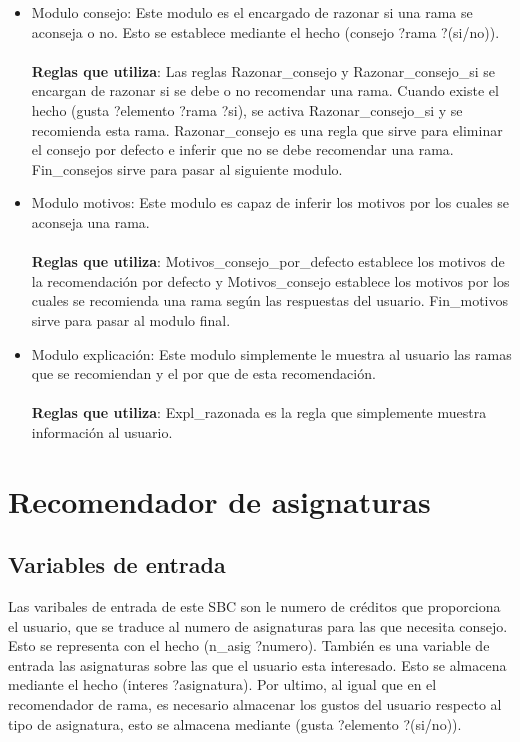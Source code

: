 \begin{itemize}
   \item Modulo consejo: Este modulo es el encargado de razonar si una rama se aconseja o no. Esto se establece mediante el hecho (consejo ?rama ?(si/no)).
   \\\\
   \textbf{Reglas que utiliza}: Las reglas Razonar\_consejo y Razonar\_consejo\_si se encargan de razonar si se debe o no recomendar una rama. Cuando existe el hecho (gusta ?elemento ?rama ?si), se activa Razonar\_consejo\_si y se recomienda esta rama. Razonar\_consejo es una regla que sirve para eliminar el consejo por defecto e inferir que no se debe recomendar una rama. Fin\_consejos sirve para pasar al siguiente modulo.

   \item Modulo motivos: Este modulo es capaz de inferir los motivos por los cuales se aconseja una rama.
   \\\\
   \textbf{Reglas que utiliza}: Motivos\_consejo\_por\_defecto establece los motivos de la recomendación por defecto y Motivos\_consejo establece los motivos por los cuales se recomienda una rama según las respuestas del usuario. Fin\_motivos sirve para pasar al modulo final.

   \item Modulo explicación: Este modulo simplemente le muestra al usuario las ramas que se recomiendan y el por que de esta recomendación.
   \\\\
   \textbf{Reglas que utiliza}: Expl\_razonada es la regla que simplemente muestra información al usuario.

\end{itemize}

\section{Recomendador de asignaturas}
\subsection{Variables de entrada}
Las varibales de entrada de este SBC son le numero de créditos que proporciona el usuario, que se traduce al numero de asignaturas para las que necesita consejo. Esto se representa con el hecho (n\_asig ?numero). También es una variable de entrada las asignaturas sobre las que el usuario esta interesado. Esto se almacena mediante el hecho (interes ?asignatura). Por ultimo, al igual que en el recomendador de rama, es necesario almacenar los gustos del usuario respecto al tipo de asignatura, esto se almacena mediante (gusta ?elemento ?(si/no)).
